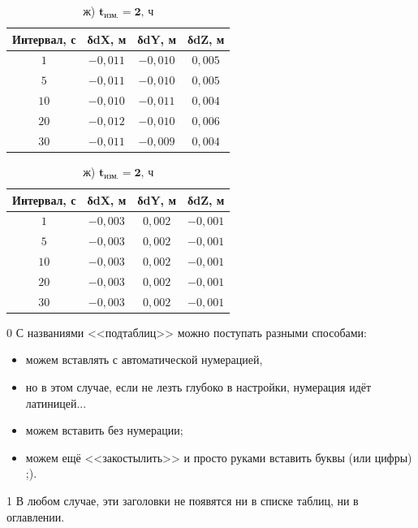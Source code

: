 \begin{table} [htbp]
{			\hfill
\begin{subtable}{.47\linewidth}	
	\centering
	\caption*{$\mathbf{t_\text{изм.}=1\text{, ч}}$}
	\begin{tabular}{|c|c|c|c|}
		\hline
		\textbf{Интервал, с}	& \textbf{δdX, м}	& \textbf{δdY, м}	& \textbf{δdZ, м}	\\ \hline
		$ 1$					& $-0,011$			& $-0,010$			& $ 0,005$			\\ \hline
		$ 5$					& $-0,011$			& $-0,010$			& $ 0,005$			\\ \hline
		$10$					& $-0,010$			& $-0,011$			& $ 0,004$			\\ \hline
		$20$					& $-0,012$			& $-0,010$			& $ 0,006$			\\ \hline
		$30$					& $-0,011$			& $-0,009$			& $ 0,004$			\\ \hline
	\end{tabular}
\end{subtable}%
\qquad
\begin{subtable}{.47\linewidth}	
	\centering
	\caption*{ж) $\mathbf{t_\text{изм.}=2\text{, ч}}$}
	\begin{tabular}{|c|c|c|c|}
		\hline
		\textbf{Интервал, с}	& \textbf{δdX, м}	& \textbf{δdY, м}	& \textbf{δdZ, м}	\\ \hline
		$ 1$					& $-0,003$			& $ 0,002$			& $-0,001$			\\ \hline
		$ 5$					& $-0,003$			& $ 0,002$			& $-0,001$			\\ \hline
		$10$					& $-0,003$			& $ 0,002$			& $-0,001$			\\ \hline
		$20$					& $-0,003$			& $ 0,002$			& $-0,001$			\\ \hline
		$30$					& $-0,003$			& $ 0,002$			& $-0,001$			\\ \hline
	\end{tabular}
\end{subtable}\hfill%

			
			
			
			
	\begin{tablenotes}
		\item [0] С названиями <<подтаблиц>> можно поступать разными способами:
		\begin{itemize}
			\item можем вставлять с автоматической нумерацией,
			\item но в этом случае, если не лезть глубоко в настройки, нумерация идёт латиницей...
			\item можем вставить без нумерации; 
			\item можем ещё <<закостылить>> и просто руками вставить буквы (или цифры) ;).
		\end{itemize}
		
		\item [1] В любом случае, эти заголовки не появятся ни в списке таблиц, ни в оглавлении.
	\end{tablenotes}
	}
\end{table}

